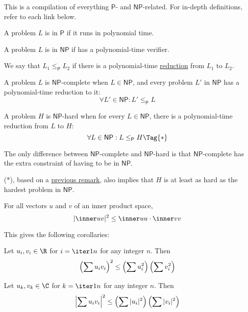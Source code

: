 \label{e04bcbc}

This is a compilation of everything $\mathsf P$- and
$\mathsf{NP}$-related. For in-depth definitions, refer to each link
below.

A problem $L$ is in $\mathsf P$ if it runs in polynomial time.

A problem $L$ is in $\mathsf{NP}$ if has a polynomial-time verifier.

We say that $L_1\leq_{\mathsf P}L_2$ if there is a polynomial-time
\href{e009acb}{reduction} from $L_1$ to $L_2$.

A problem $L$ is $\mathsf{NP}$-complete when $L\in\mathsf{NP}$, and
every problem $L'$ in $\mathsf{NP}$ has a polynomial-time reduction to
it:
$$
	\forall L'\in\mathsf{NP}: L'\leq_{\mathsf P}L
$$

A problem $H$ is $\mathsf{NP}$-hard when for every $L\in\mathsf{NP}$,
there is a polynomial-time reduction from $L$ to $H$:
\begin{equation*}
	\forall L\in\mathsf{NP}: L\leq_{\mathsf P}H\Tag{*}
\end{equation*}

The only difference between $\mathsf{NP}$-complete and
$\mathsf{NP}$-hard is that $\mathsf{NP}$-complete has the extra
constraint of having to be in $\mathsf{NP}$.

($*$), based on a \href{e04bcbc}{previous remark}, also implies that
$H$ is at least as hard as the hardest problem in $\mathsf{NP}$.

\label{c503127}

For all vectors $u$ and $v$ of an inner product space,
$$
	|\inner uv|^2\leq\inner uu\cdot\inner vv
$$

This gives the following corollaries:
\begin{enumerata}

	\item Let $u_i,v_i\in\R$ for $i=\iter1n$ for any integer $n$.
	Then
	\begin{equation*}
		\def\su{\sum}\def\u{u_i}\def\v{v_i}
		\left(\su\u\v\right)^2\leq\left(\su\u^2\right)\left(\su\v^2\right)
	\end{equation*}

	\item Let $u_k,v_k\in\C$ for $k=\iter1n$ for any integer $n$. Then
	\begin{equation*}
		\def\su{\sum}\def\u{u_i}\def\v{v_i}
		\left|\su\u\v\right|^2\leq\left(\su|\u|^2\right)\left(\su|\v|^2\right)
	\end{equation*}
\end{enumerata}

